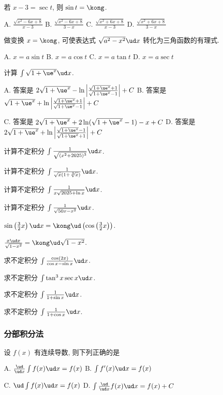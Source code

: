 若 $x-3=\sec t$, 则 $\sin t=\kong$.

A. $\frac{\sqrt{x^2-6x+8}}{x-3}$\qquad
B. $\frac{\sqrt{x^2-6x+8}}{3-x}$\qquad
C. $\frac{\sqrt{x^2+6x+8}}{x-3}$\qquad
D. $\frac{\sqrt{x^2+6x+8}}{3-x}$
\eq

做变换 $x=\kong$, 可使表达式 $\sqrt{a^2-x^2}\ud x$ 转化为三角函数的有理式.

A. $x=a\sin t$\qquad
B. $x=a\cos t$\qquad
C. $x=a\tan t$\qquad
D. $x=a\sec t$
\eq

计算 $\int\sqrt{1+\ue^x}\ud x$.

A. 答案是 $2\sqrt{1+\ue^x}-\ln\left|\frac{\sqrt{1+\ue^x}+1}{\sqrt{1+\ue^x}-1}\right|+C$\qquad
B. 答案是 $\sqrt{1+\ue^x}+\ln\left|\frac{\sqrt{1+\ue^x}+1}{\sqrt{1+\ue^x}-1}\right|+C$

C. 答案是 $2\sqrt{1+\ue^x}+2\ln(\sqrt{1+\ue^x}-1)-x+C$\qquad
D. 答案是 $2\sqrt{1+\ue^x}+\ln\left|\frac{\sqrt{1+\ue^x}-1}{\sqrt{1+\ue^x}+1}\right|+C$
\eq

\bq{}{}
计算不定积分 $\int\frac1{\sqrt{(x^2+2025)^3}}\ud x$.
\eq

\bq{}{}
计算不定积分 $\int\frac1{\sqrt{x}(1+\sqrt[3]{x})}\ud x$.
\eq

\bq{}{}
计算不定积分 $\int\frac1{x\sqrt{2025+\ln x}}\ud x$.
\eq

\bq{}{}
计算不定积分 $\int\frac1{\sqrt{50x-x^2}}\ud x$.
\eq

$\sin\left(\frac32x\right)\ud x=\kong\ud\left(\cos\left(\frac32x\right)\right)$.
\eq

$\frac{x\ud x}{\sqrt{1-x^2}}=\kong\ud\sqrt{1-x^2}$.
\eq

\bq{}{}
求不定积分 $\int\frac{\cos(2x)}{\cos x-\sin x}\ud x$.
\eq

\bq{}{}
求不定积分 $\int \tan^3x\sec x\ud x$.
\eq

\bq{}{}
求不定积分 $\int\frac1{1+\sin x}\ud x$.
\eq

\bq{}{}
求不定积分 $\int\frac1{1+\cos x}\ud x$.
\eq

\subsubsection{分部积分法}

设 $f(x)$ 有连续导数, 则下列正确的是

A. $\frac{\ud}{\ud x}\int f(x)\ud x=f(x)$\qquad
B. $\int f'(x)\ud x=f(x)$

C. $\ud\int f(x)\ud x=f(x)$\qquad
D. $\int\frac{\ud}{\ud x}f(x)\ud x=f(x)+C$

